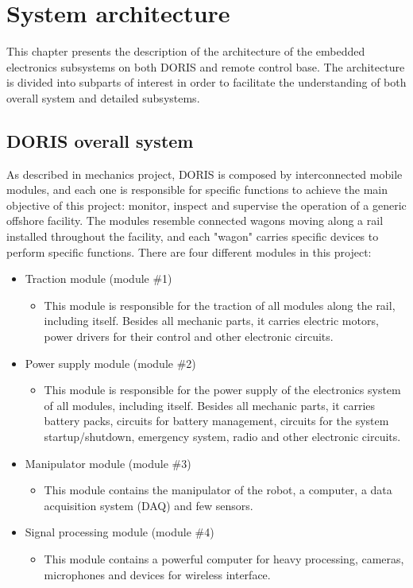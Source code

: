 

\chapter{System architecture}
This chapter presents the description of the architecture of the embedded electronics subsystems on both DORIS and remote control base. The architecture is divided into subparts of interest in order to facilitate the understanding of both overall system and detailed subsystems.


\section{DORIS overall system}
As described in mechanics project, DORIS is composed by interconnected mobile modules, and each one is responsible for specific functions to achieve the main objective of this project: monitor, inspect and supervise the operation of a generic offshore facility. The modules resemble connected wagons moving along a rail installed throughout the facility, and each "wagon" carries specific devices to perform specific functions.
\newline
There are four different modules in this project:
\begin{itemize}
  \item Traction module (module \#1)
  \begin{itemize}
    \item This module is responsible for the traction of all modules along the rail, including itself. Besides all mechanic parts, it carries electric motors, power drivers for their control and other electronic circuits.
  \end{itemize}
  \item Power supply module (module \#2)
  \begin{itemize}
    \item This module is responsible for the power supply of the electronics system of all modules, including itself. Besides all mechanic parts, it carries battery packs, circuits for battery management, circuits for the system startup/shutdown, emergency system, radio and other electronic circuits.
  \end{itemize}
  \item Manipulator module (module \#3)
  \begin{itemize}
    \item This module contains the manipulator of the robot, a computer, a data acquisition system (DAQ) and few sensors.
  \end{itemize}
  \item Signal processing module (module \#4)
  \begin{itemize}
    \item This module contains a powerful computer for heavy processing, cameras, microphones and devices for wireless interface.
  \end{itemize}
\end{itemize}
